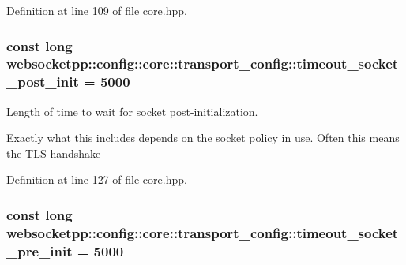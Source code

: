 Definition at line 109 of file core.\+hpp.

\subsubsection[{\texorpdfstring{timeout\+\_\+socket\+\_\+post\+\_\+init}{timeout\_socket\_post\_init}}]{\setlength{\rightskip}{0pt plus 5cm}const long websocketpp\+::config\+::core\+::transport\+\_\+config\+::timeout\+\_\+socket\+\_\+post\+\_\+init = 5000\hspace{0.3cm}{\ttfamily [static]}}\hypertarget{structwebsocketpp_1_1config_1_1core_1_1transport__config_aed4eae8f2370c532a05e51a2f006fc71}{}\label{structwebsocketpp_1_1config_1_1core_1_1transport__config_aed4eae8f2370c532a05e51a2f006fc71}


Length of time to wait for socket post-\/initialization. 

Exactly what this includes depends on the socket policy in use. Often this means the T\+LS handshake 

Definition at line 127 of file core.\+hpp.

\subsubsection[{\texorpdfstring{timeout\+\_\+socket\+\_\+pre\+\_\+init}{timeout\_socket\_pre\_init}}]{\setlength{\rightskip}{0pt plus 5cm}const long websocketpp\+::config\+::core\+::transport\+\_\+config\+::timeout\+\_\+socket\+\_\+pre\+\_\+init = 5000\hspace{0.3cm}{\ttfamily [static]}}\hypertarget{structwebsocketpp_1_1config_1_1core_1_1transport__config_ab35c5322043bee05f2a66444f41a9be9}{}\label{structwebsocketpp_1_1config_1_1core_1_1transport__config_ab35c5322043bee05f2a66444f41a9be9}


